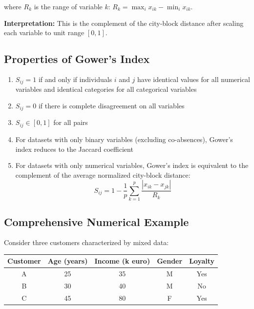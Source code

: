 \documentclass[11pt]{article}
\begin{document}
where $R_k$ is the range of variable $k$: $R_k = \max_i x_{ik} - \min_i x_{ik}$.

\textbf{Interpretation:} This is the complement of the city-block distance after scaling each variable to unit range $[0, 1]$.

\subsection{Properties of Gower's Index}

\begin{enumerate}
    \item $S_{ij} = 1$ if and only if individuals $i$ and $j$ have identical values for all numerical variables and identical categories for all categorical variables
    
    \item $S_{ij} = 0$ if there is complete disagreement on all variables
    
    \item $S_{ij} \in [0, 1]$ for all pairs
    
    \item For datasets with only binary variables (excluding co-absences), Gower's index reduces to the Jaccard coefficient
    
    \item For datasets with only numerical variables, Gower's index is equivalent to the complement of the average normalized city-block distance:
    $$S_{ij} = 1 - \frac{1}{p}\sum_{k=1}^{p} \frac{|x_{ik} - x_{jk}|}{R_k}$$
\end{enumerate}

\subsection{Comprehensive Numerical Example}

Consider three customers characterized by mixed data:

\begin{center}
\begin{tabular}{c|cccc}
Customer & Age (years) & Income (k euro) & Gender & Loyalty \\
\hline
A & 25 & 35 & M & Yes \\
B & 30 & 40 & M & No \\
C & 45 & 80 & F & Yes \\
\end{tabular}
\end{center}
\end{document}
